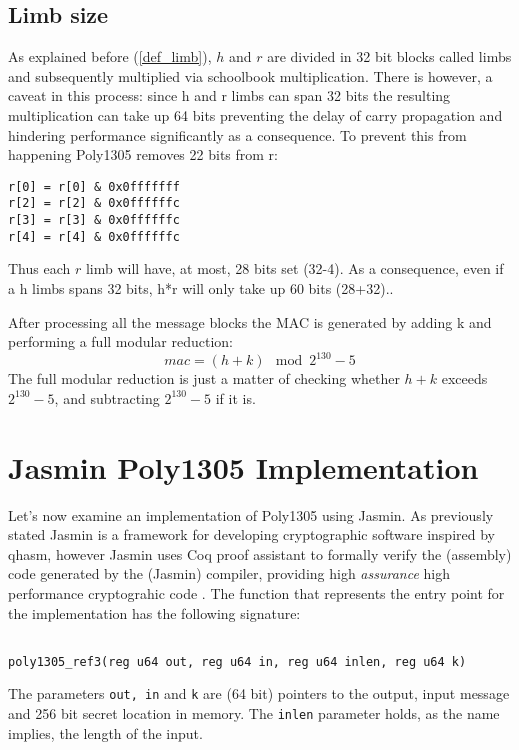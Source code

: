 \documentclass{article}
\begin{document}
\subsection{Limb size}
As explained before (\ref{def_limb}), $h$ and $r$ are divided in 32 bit blocks called limbs and subsequently multiplied via schoolbook multiplication. There is 
however, a caveat in this process: since h and r limbs can span 32 bits  the resulting multiplication can take up 64 bits preventing the delay of carry propagation 
and hindering performance significantly as a consequence. To prevent this from happening Poly1305 removes 22 bits from r:
\begin{Verbatim}[fontsize=\footnotesize]
r[0] = r[0] & 0x0fffffff
r[2] = r[2] & 0x0ffffffc
r[3] = r[3] & 0x0ffffffc
r[4] = r[4] & 0x0ffffffc
\end{Verbatim}

Thus each $r$ limb will have, at most, 28 bits set (32-4). As a consequence, even if a h limbs spans 32 bits, h*r will only take up 60 bits (28+32)..

After processing all the message blocks the MAC is generated by adding k and performing a full modular reduction:
$$mac = (h+k) \mod{2^{130}-5} $$
\newline
The full modular reduction is just a matter of checking whether $h+k$ exceeds $2^{130}-5$, and subtracting $2^{130}-5$ if it is.

\section{Jasmin Poly1305 Implementation}
Let's now examine an implementation of Poly1305 using Jasmin. As previously stated Jasmin is a framework for developing cryptographic software inspired by qhasm, 
however Jasmin uses Coq proof assistant to formally verify the (assembly) code generated by the (Jasmin) compiler, providing high \textit{assurance} high 
performance cryptograhic code \cite{jasmin_paper}. The function that represents the entry point for the implementation has the following signature: 

\begin{Verbatim}[fontsize=\footnotesize]

poly1305_ref3(reg u64 out, reg u64 in, reg u64 inlen, reg u64 k)

\end{Verbatim}

The parameters \texttt{out, in} and \texttt{k} are (64 bit) pointers to the output, input message and 256 bit secret location in memory. The \texttt{inlen} 
parameter holds, as the name implies, the length of the input.
\end{document}
